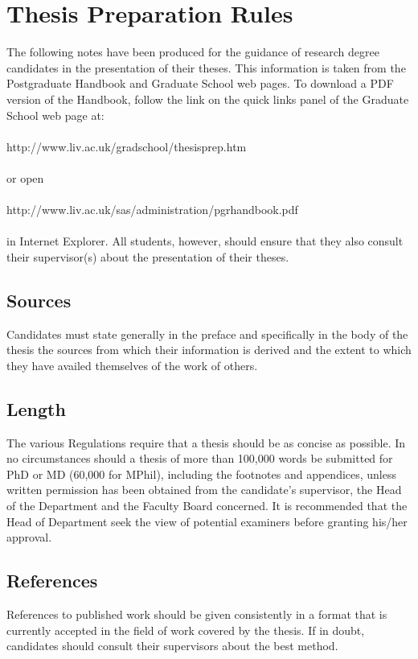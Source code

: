 \chapter{Thesis Preparation Rules}

The following notes have been produced for the guidance of research 
degree candidates in the presentation of their theses. This information is 
taken from the Postgraduate Handbook and Graduate School web pages. 
To download a PDF version of the Handbook, follow the link on the 
quick links panel of the Graduate School web page at:
\\
\\
http://www.liv.ac.uk/gradschool/thesisprep.htm
\\
\\
or open 
\\
\\
http://www.liv.ac.uk/sas/administration/pgrhandbook.pdf
\\
\\
in Internet 
Explorer.  All students, however, should ensure that they also consult 
their supervisor(s) about the presentation of their theses.

\section{Sources}
Candidates must state generally in the preface and specifically in the body 
of the thesis the sources from which their information is derived and the 
extent to which they have availed themselves of the work of others.

\section{Length}
The various Regulations require that a thesis should be as concise as 
possible. In no circumstances should a thesis of more than 100,000 words 
be submitted for PhD or MD (60,000 for MPhil), including the footnotes 
and appendices, unless written permission has been obtained from the 
candidate's supervisor, the Head of the Department and the Faculty Board 
concerned. It is recommended that the Head of Department seek the view 
of potential examiners before granting his/her approval.

\section{References}
References to published work should be given consistently in a format that 
is currently accepted in the field of work covered by the thesis. If in doubt, 
candidates should consult their supervisors about the best method.

